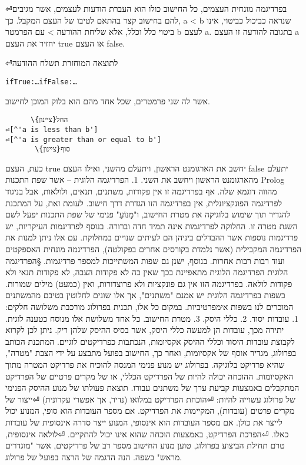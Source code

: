 \begin{טבלא}[!htbp]
⏎בפרדיגמה מונחית העצמים, כל החישוב כולו הוא העברת הודעות לעצמים, אשר
      מגיבים להם בחישוב קצר בהתאם לטיבו של העצם המקבל. כך, a < b שנראה
      כביכול כביטוי, אינו ביטוי כלל וכלל, אלא שליחת ההודעה > עם הפרמטר b
      לעצם a. בתגובה להודעה זו העצם a יחזיר את העצם true או העצם false.

⏎לתוצאה המוחזרת תשלח ההודעה

\begin{verbatim}
ifTrue:…ifFalse:…
\end{verbatim}

      אשר לה שני פרמטרים, שכל אחד מהם הוא בלוק המוכן לחישוב.
\begin{verbatim}
      \החל{ציינון}
⏎[^'a is less than b']
⏎[^'a is greater than or equal to b']
       \סוף{ציינון}
\end{verbatim}
      כעת, העצם true יחשב את הארגומנט הראשון, ויתעלם מהשני, ואילו העצם false יתעלם מהארגומנט הראשון ויחשב את השני.
      1. הפרדיגמה הלוגית – אשר שפת התכנות Prolog מהווה דוגמא שלה. אף בפרדיגמה זו אין פקודות, משתנים, תנאים, ולולאות, אבל בניגוד לפרדיגמה הפונקציונלית, אין בפרדיגמה הזו הגדרת דרך חישוב. לעומת זאת, על המתכנת להגדיר תוך שימוש בלוגיקה את מטרת החישוב, ו"מָנוֹעַ" פנימי של שפת התכנות יפעל לשם השגת מטרה זו.
      החלוקה לפרדיגמות אינה תמיד חדה וברורה. בנוסף לפרדיגמות העיקריות, יש פרדיגמות נוספות אשר ההבדלים ביניהן הם לעיתים שנויים במחלוקת. עם אלו ניתן למנות את הפרדיגמה המקבילית (אשר נלמדת בקורסים אחרים בפקולטה), הפרדיגמה מונחית האספקטים ועוד רבות רבות אחרות. בנוסף, ישנן גם שפות המשתייכות למספר פרדיגמות.
      §הפרדיגמה הלוגית
      הפרדיגמה הלוגית מתאפיינת בכך שאין בה לא פקודות הצבה, לא פקודות תנאי ולא פקודות לולאה. בפרדיגמה הזו אין גם פונקציות ולא פרוצדורות, ואין (כמעט) מילים שמורות. בשפות בפרדיגמה הלוגית יש אמנם "משתנים", אך אלו שונים לחלוטין בטיבם מהמשתנים המוכרים לנו בשפות אימפרטיביות.
      במקום כל אלו, תכנית בפרולוג מורכבת משלושה חלקים:
      1. עובדות יסוד.
      2. כללי היסק.
      3. מטרת החישוב.
      כל אחד משלושת אלו מנוסח כטענה לוגית. יתירה מכך, עובדות הן למעשה כללי היסק, אשר בסיס ההיסק שלהן ריק. ניתן לכן לקרוא לקבוצת עובדות היסוד וכללי ההיסק אקסיומות, הנכתבות כפרדיקטים לוגיים. המתכנת הכותב בפרולוג, מגדיר אוסף של אקסיומות, ואחר כך, החישוב בפועל מתבצע על ידי הצבת "מטרה", שהיא פרדיקט בלוגיקה.
      בפרולוג יש מנוע פנימי המנסה להוכיח את פרדיקט המטרה מתוך האקסיומות. ההוכחה יכולה להיות של הפרדיקט הכללי, או של מקרים פרטיים של הפרדיקט המתקבלים באמצעות קביעת ערך של משתנים עבורו.
      תוצאת פעולתו של מנוע ההיסק הפנימי של פרולוג עשוייה להיות:
⏎הוכחת הפרדיקט במלואו (נדיר, אך אפשרי עקרונית)
⏎ייצור של מקרים פרטים (עובדות), המקיימות את הפרדיקט. אם מספר העובדות הוא סופי, המנוע יכול לייצר את כולן. אם מספר העובדות הוא אינסופי, המנוע ייצר סדרה אינסופית של עובדות כאלו.
⏎הפרכת הפרדיקט, באמצעות הוכחה שהוא אינו יכול להתקיים.
⏎לולאה אינסופית,
      טרם תחילת הביצוע בפרולוג, טוען מנוע החישוב מספר רב של פרדיקטים, אשר "מוגדרים מראש" בשפה.
      הנה הדגמה של הרצה בפועל של פרולוג.


\end{טבלא}
